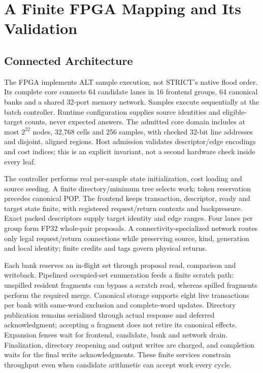 \section{A Finite FPGA Mapping and Its Validation}
\subsection{Connected Architecture}
The FPGA implements ALT sample execution, not STRICT's native flood order. Its complete core connects 64 candidate lanes in 16 frontend groups, 64 canonical banks and a shared 32-port memory network. Samples execute sequentially at the batch controller. Runtime configuration supplies source identities and eligible-target counts, never expected answers. The admitted core domain includes at most $2^{22}$ nodes, 32,768 cells and 256 samples, with checked 32-bit line addresses and disjoint, aligned regions. Host admission validates descriptor/edge encodings and cost indices; this is an explicit invariant, not a second hardware check inside every leaf.

The controller performs real per-sample state initialization, cost loading and source seeding. A finite directory/minimum tree selects work; token reservation precedes canonical POP. The frontend keeps transaction, descriptor, ready and target state finite, with registered request/return contexts and backpressure. Exact packed descriptors supply target identity and edge ranges. Four lanes per group form FP32 whole-pair proposals. A connectivity-specialized network routes only legal request/return connections while preserving source, kind, generation and local identity; finite credits and tags govern physical returns.

Each bank reserves an in-flight set through proposal read, comparison and writeback. Pipelined occupied-set enumeration feeds a finite scratch path: unspilled resident fragments can bypass a scratch read, whereas spilled fragments perform the required merge. Canonical storage supports eight live transactions per bank with same-word exclusion and complete-word updates. Directory publication remains serialized through actual response and deferred acknowledgment; accepting a fragment does not retire its canonical effects. Expansion fences wait for frontend, candidate, bank and network drain. Finalization, directory reopening and output writes are charged, and completion waits for the final write acknowledgments. These finite services constrain throughput even when candidate arithmetic can accept work every cycle.

